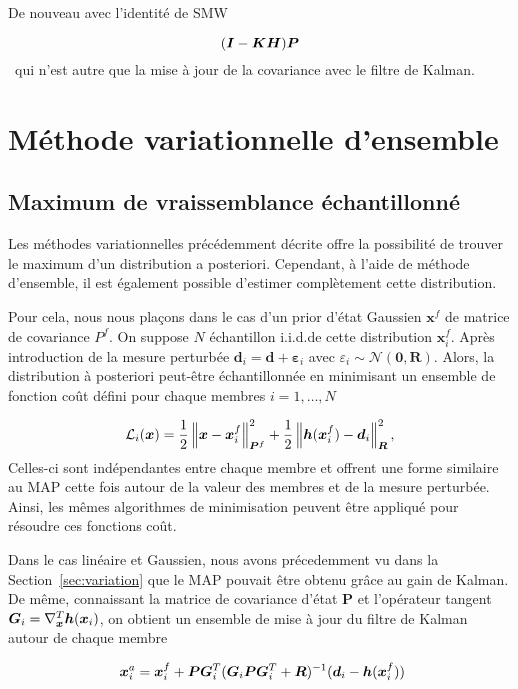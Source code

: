 De nouveau avec l'identité de SMW

\begin{equation*}
    (\bm{I} - \bm{K} \bm{H}) \bm{P}
\end{equation*}~qui n'est autre que la mise à jour de la covariance avec le filtre de Kalman.

\section{Méthode variationnelle d'ensemble}

\subsection{Maximum de vraissemblance échantillonné}
Les méthodes variationnelles précédemment décrite offre la possibilité de trouver le maximum d'un distribution a posteriori. Cependant, à l'aide de méthode d'ensemble, il est également possible d'estimer complètement cette distribution.

Pour cela, nous nous plaçons dans le cas d'un prior d'état Gaussien $\bm x^f$ de matrice de covariance $P^f$. On suppose $N$ échantillon i.i.d.de cette distribution $\bm x^f_i$. Après introduction de la mesure perturbée $\bm d_i = \bm d + \bm \varepsilon_i$ avec $\varepsilon_i \sim \mathcal{N}(\bm 0, \bm R)$. Alors, la distribution à posteriori peut-être échantillonnée en minimisant un ensemble de fonction coût défini pour chaque membres $i = 1, \dots, N$

\begin{equation*}
    \mathcal L_i(\bm x) = \frac12 \left\lVert \bm x -\bm x^f_i \right\rVert^2_{\bm P^f} + \frac12 \left\lVert \bm h(\bm x^f_i) - \bm d_i \right\rVert_{\bm R}^2,
\end{equation*}Celles-ci sont indépendantes entre chaque membre et offrent une forme similaire au MAP cette fois autour de la valeur des membres et de la mesure perturbée. Ainsi, les mêmes algorithmes de minimisation peuvent être appliqué pour résoudre ces fonctions coût.

Dans le cas linéaire et Gaussien, nous avons précedemment vu dans la Section~\ref{sec:variation} que le MAP pouvait être obtenu grâce au gain de Kalman. De même, connaissant la matrice de covariance d'état $\bm P$ et l'opérateur tangent $\bm G_i = \nabla^T_{\bm{x}} \bm h(\bm{x}_i)$, on obtient un ensemble de mise à jour du filtre de Kalman autour de chaque membre

\begin{equation}~\label{eq:rml-kalman}
    \bm x ^a_i = \bm x^f_i + \bm P \bm G_i^T (\bm G_i \bm{P} \bm G_i^T + \bm{R})^{-1} (\bm{d}_i - \bm h(\bm{x}_i^f))
\end{equation}

